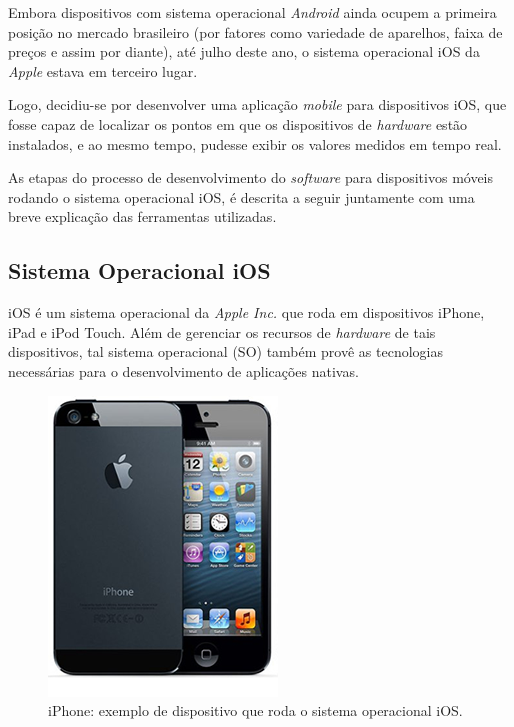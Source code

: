 \documentclass[
    12pt,               %
    openright,          %
    oneside,
    a4paper,            
    english,            %
    brazil              %
    ]{abntex2}
\begin{document}
Embora dispositivos com sistema operacional \textit{Android} ainda ocupem a primeira posição no mercado brasileiro (por fatores como variedade de aparelhos, faixa de preços e assim por diante), até julho deste ano, o sistema operacional iOS da \textit{Apple} estava em terceiro lugar.

Logo, decidiu-se por desenvolver uma aplicação \textit{mobile} para dispositivos iOS, que fosse capaz de localizar os pontos em que os dispositivos de \textit{hardware} estão instalados, e ao mesmo tempo, pudesse exibir os valores medidos em tempo real.

As etapas do processo de desenvolvimento do \textit{software} para dispositivos móveis rodando o sistema operacional iOS, é descrita a seguir juntamente com uma breve explicação das ferramentas utilizadas.

\subsection{Sistema Operacional iOS}

iOS é um sistema operacional da \textit{Apple Inc.} que roda em dispositivos iPhone, iPad e iPod Touch. Além de gerenciar os recursos de \textit{hardware} de tais dispositivos, tal sistema operacional (SO) também provê as tecnologias necessárias para o desenvolvimento de aplicações nativas.

\begin{figure}[!htb]
  \begin{center}
    \caption{\label{iphone}iPhone: exemplo de dispositivo que roda o sistema operacional iOS.}
    \includegraphics[scale=0.39]{images/iphone.png}
  \end{center}
\end{figure}
\end{document}

